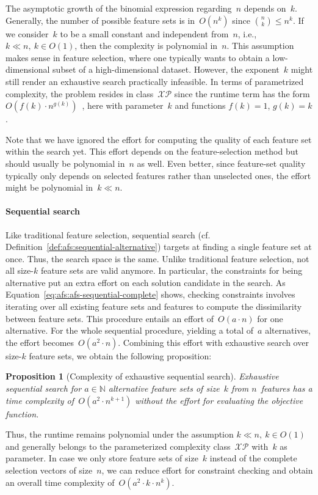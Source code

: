 \documentclass{article}
\newtheorem{proposition}[corollary]{Proposition} %
\theoremstyle{definition}
\begin{document}
The asymptotic growth of the binomial expression regarding~$n$ depends on~$k$.
Generally, the number of possible feature sets is in~$O(n^k)$ since $\binom{n}{k} \leq n^k$.
If we consider~$k$ to be a small constant and independent from~$n$, i.e., $k \ll n,~k \in O(1)$, then the complexity is polynomial in~$n$.
This assumption makes sense in feature selection, where one typically wants to obtain a low-dimensional subset of a high-dimensional dataset.
However, the exponent~$k$ might still render an exhaustive search practically infeasible.
In terms of parametrized complexity, the problem resides in class~$\mathcal{XP}$ since the runtime term has the form $O(f(k) \cdot n^{g(k)})$~\cite{downey1997parameterized}, here with parameter~$k$ and functions $f(k) = 1$, $g(k) = k$.

Note that we have ignored the effort for computing the quality of each feature set within the search yet.
This effort depends on the feature-selection method but should usually be polynomial in~$n$ as well.
Even better, since feature-set quality typically only depends on selected features rather than unselected ones, the effort might be polynomial in~$k \ll n$.

\paragraph{Sequential search}

Like traditional feature selection, sequential search (cf. Definition~\ref{def:afs:sequential-alternative}) targets at finding a single feature set at once.
Thus, the search space is the same.
Unlike traditional feature selection, not all size-$k$ feature sets are valid anymore.
In particular, the constraints for being alternative put an extra effort on each solution candidate in the search.
As Equation~\ref{eq:afs:afs-sequential-complete} shows, checking constraints involves iterating over all existing feature sets and features to compute the dissimilarity between feature sets.
This procedure entails an effort of~$O(a \cdot n)$ for one alternative.
For the whole sequential procedure, yielding a total of~$a$ alternatives, the effort becomes~$O(a^2 \cdot n)$.
Combining this effort with exhaustive search over size-$k$ feature sets, we obtain the following proposition:
%
\begin{proposition}[Complexity of exhaustive sequential search]
	Exhaustive sequential search for $a \in \mathbb{N}$ alternative feature sets of size~$k$ from $n$~features has a time complexity of~$O(a^2 \cdot n^{k+1})$ without the effort for evaluating the objective function.
	\label{prop:afs:complexity-exhaustive-sequential}
\end{proposition}
%
Thus, the runtime remains polynomial under the assumption $k \ll n,~k \in O(1)$ and generally belongs to the parameterized complexity class~$\mathcal{XP}$ with~$k$ as parameter.
In case we only store feature sets of size~$k$ instead of the complete selection vectors of size~$n$, we can reduce effort for constraint checking and obtain an overall time complexity of~$O(a^2 \cdot k \cdot n^k)$.
\end{document}
